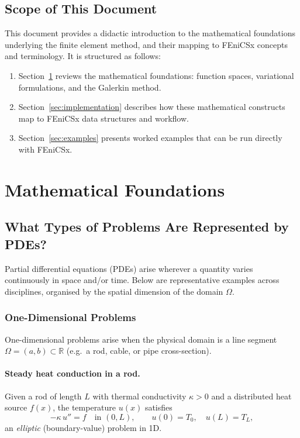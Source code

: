 \documentclass[11pt]{article}
\newcommand{\R}{\mathbb{R}}
\newcommand{\domain}{\Omega}
\begin{document}
\subsection{Scope of This Document}

This document provides a didactic introduction to the mathematical foundations
underlying the finite element method, and their mapping to FEniCSx concepts and terminology.
It is structured as follows:
\begin{enumerate}
  \item Section~\ref{sec:math} reviews the mathematical foundations:
    function spaces, variational formulations, and the Galerkin method.
  \item Section~\ref{sec:implementation} describes how these mathematical
    constructs map to FEniCSx data structures and workflow.
  \item Section~\ref{sec:examples} presents worked examples that can be
    run directly with FEniCSx.
\end{enumerate}

\section{Mathematical Foundations}
\label{sec:math}

\subsection{What Types of Problems Are Represented by PDEs?}
\label{subsec:pde-types}

Partial differential equations (PDEs) arise wherever a quantity varies
continuously in space and/or time.
Below are representative examples across disciplines, organised by the spatial
dimension of the domain $\domain$.

\subsubsection{One-Dimensional Problems}

One-dimensional problems arise when the physical domain is a line segment
$\domain = (a,b) \subset \R$ (e.g.\ a rod, cable, or pipe cross-section).

\paragraph{Steady heat conduction in a rod.}
Given a rod of length $L$ with thermal conductivity $\kappa > 0$ and a
distributed heat source $f(x)$, the temperature $u(x)$ satisfies
\begin{equation*}
  -\kappa\,u'' = f \quad \text{in } (0,L),
  \qquad u(0) = T_0,\quad u(L) = T_L,
\end{equation*}
an \emph{elliptic} (boundary-value) problem in 1D.
\end{document}
